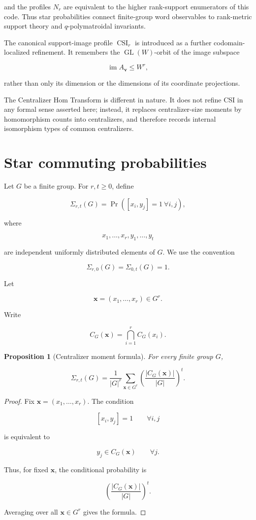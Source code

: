 \documentclass[11pt]{article}
\newtheorem{proposition}[theorem]{Proposition}
\begin{document}
and the profiles $N_r$ are equivalent to the higher rank-support enumerators of this code. Thus star probabilities connect finite-group word observables to rank-metric support theory and $q$-polymatroidal invariants.

The canonical support-image profile $\operatorname{CSI}_r$ is introduced as a further codomain-localized refinement. It remembers the $\operatorname{GL}(W)$-orbit of the image subspace

\[
\operatorname{im}A_{\mathbf v}\le W^r,
\]

rather than only its dimension or the dimensions of its coordinate projections.

The Centralizer Hom Transform is different in nature. It does not refine CSI in any formal sense asserted here; instead, it replaces centralizer-size moments by homomorphism counts into centralizers, and therefore records internal isomorphism types of common centralizers.


\section{Star commuting probabilities}

Let $G$ be a finite group. For $r,t\ge0$, define

\[
\Sigma_{r,t}(G)=
\Pr([x_i,y_j]=1\ \forall i,j),
\]

where

\[
x_1,\dots,x_r,y_1,\dots,y_t
\]

are independent uniformly distributed elements of $G$. We use the convention

\[
\Sigma_{r,0}(G)=\Sigma_{0,t}(G)=1.
\]

Let

\[
\mathbf x=(x_1,\dots,x_r)\in G^r.
\]

Write

\[
C_G(\mathbf x)
=\bigcap_{i=1}^rC_G(x_i).
\]

\begin{proposition}[Centralizer moment formula]

For every finite group $G$,

\[
\Sigma_{r,t}(G)
=\frac1{|G|^r}
\sum_{\mathbf x\in G^r}
\left(
\frac{|C_G(\mathbf x)|}{|G|}
\right)^t.
\]

\end{proposition}
\begin{proof}

Fix $\mathbf x=(x_1,\dots,x_r)$. The condition

\[
[x_i,y_j]=1
\qquad
\forall i,j
\]

is equivalent to

\[
y_j\in C_G(\mathbf x)
\qquad
\forall j.
\]

Thus, for fixed $\mathbf x$, the conditional probability is

\[
\left(
\frac{|C_G(\mathbf x)|}{|G|}
\right)^t.
\]

Averaging over all $\mathbf x\in G^r$ gives the formula.
\end{proof}
\end{document}
